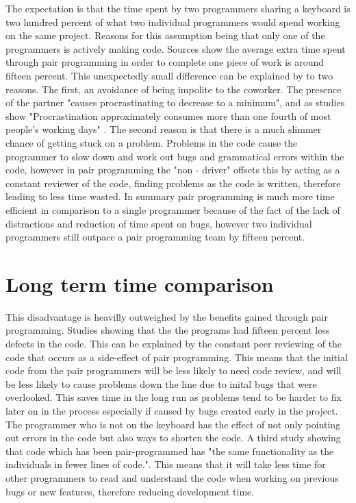 \documentclass{scrartcl}
\begin{document}
{The expectation is that the time spent by two programmers sharing a keyboard is two hundred percent of what two individual programmers would spend working on the same project. Reasons for this assumption being that only one of the programmers is actively making code.  Sources show the average extra time spent through pair programming in order to complete one piece of work is around fifteen percent\cite{Cockburn00thecosts}. This unexpectedly small difference can be explained by to two reasons. The first, an avoidance of being impolite to the coworker. The presence of the partner "causes procrastinating to decrease to a minimum"\cite{Keith:2010:AGD:1830460}, and as studies show "Procrastination approximately consumes more than one fourth of most people’s working days"\cite{Procrastination} .  The second reason is that there is a much slimmer chance of getting stuck on a problem. Problems in the code cause the programmer to slow down and work out bugs and grammatical errors within the code, however in pair programming the "non - driver" offsets this by acting as a constant reviewer of the code, finding problems as the code is written, therefore leading to less time wasted. In summary pair programming is much more time efficient in comparison to a single programmer because of the fact of the lack of distractions and reduction of time spent on bugs, however two individual programmers still outpace a pair programming team by fifteen percent. 


\section{Long term time comparison}

This disadvantage is heavilly outweighed by the benefits gained through pair programming. Studies showing that the the programs had fifteen percent less defects in the code\cite{Williams00strengtheningthe}. This can be explained by the constant peer reviewing of the code that occurs as a side-effect of pair programming. This means that the initial code from the pair programmers will be less likely to need code review, and will be less likely to cause problems down the line due to inital bugs that were overlooked. This saves time in the long run as problems tend to be harder to fix later on in the process especially if caused by bugs created early in the project.
The programmer who is not on the keyboard has the effect of not only pointing out errors in the code but also ways to shorten the code. A third study showing that code which has been pair-programmed has "the same functionality as the individuals in fewer lines of code."\cite{Cockburn00thecosts}. This means that it will take less time for other programmers to read and understand the code when working on previous bugs or new features, therefore reducing development time.


}
\end{document}

